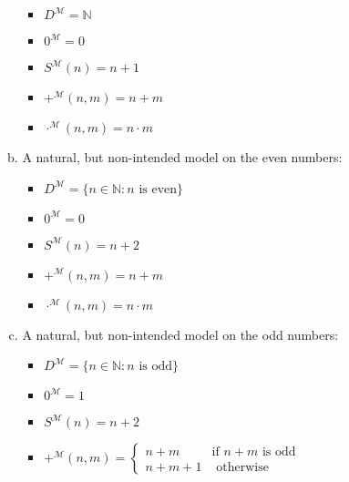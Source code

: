 \begin{enumerate}[\thesection.1]
\begin{enumerate}[(i)]
\begin{enumerate}[(a)]
\begin{itemize}
							\item $D^\mathcal{M}=\mathbb{N}$
							
							\item $0^\mathcal{M}=0$
					
							\item $S^\mathcal{M}(n)=n+1$
							
							\item $+^\mathcal{M}(n,m)=n+m$
							
							\item $\cdot^\mathcal{M}(n,m)=n\cdot m$
					
						\end{itemize}
						
					\item A natural, but non-intended model on the even numbers:
					
						\begin{itemize}
					
							\item $D^\mathcal{M}=\{n\in\mathbb{N}:n\text{ is even}\}$
																					\item $0^\mathcal{M}=0$
					
							\item $S^\mathcal{M}(n)=n+2$
							
							\item $+^\mathcal{M}(n,m)=n+m$
							
							\item $\cdot^\mathcal{M}(n,m)=n\cdot m$
					
						\end{itemize}
						
					\item A natural, but non-intended model on the odd numbers:
					
						\begin{itemize}
					
							\item $D^\mathcal{M}=\{n\in\mathbb{N}:n\text{ is odd}\}$
																					\item $0^\mathcal{M}=1$
					
							\item $S^\mathcal{M}(n)=n+2$
							
							\item $+^\mathcal{M}(n,m)=\begin{cases}n+m&\text{if }n+m\text{ is odd}\\n+m+1&\text{ otherwise}\end{cases}$
							

\end{itemize}
\end{enumerate}
\end{enumerate}
\end{enumerate}

